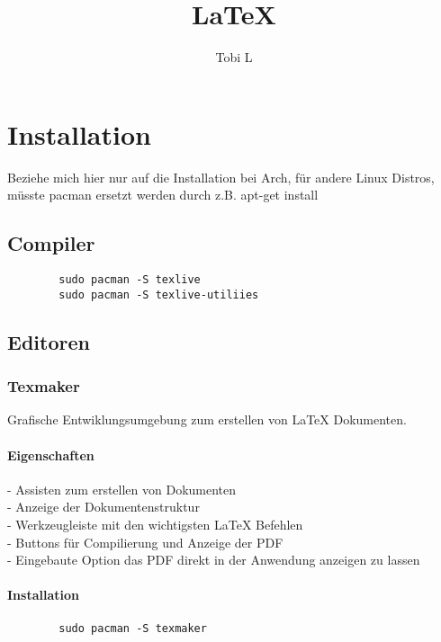 \documentclass[10pt,a4paper,oneside]{report}
\author{Tobi L}
\title{LaTeX}
\begin{document}
\maketitle
\tableofcontents
\chapter{Installation}
Beziehe mich hier nur auf die Installation bei Arch, für andere Linux Distros, müsste pacman ersetzt werden durch z.B. apt-get install\\
\section{Compiler}
	\begin{verbatim}
		sudo pacman -S texlive
		sudo pacman -S texlive-utiliies
	\end{verbatim}
\section{Editoren}
\subsection{Texmaker}
Grafische Entwiklungsumgebung zum erstellen von LaTeX Dokumenten.\\
\subsubsection{Eigenschaften}
	\hspace*{5mm} - Assisten zum erstellen von Dokumenten\\
	\hspace*{5mm} - Anzeige der Dokumentenstruktur\\
	\hspace*{5mm} - Werkzeugleiste mit den wichtigsten LaTeX Befehlen\\
	\hspace*{5mm} - Buttons für Compilierung und Anzeige der PDF\\
	\hspace*{5mm} - Eingebaute Option das PDF direkt in der Anwendung anzeigen zu lassen\\
\subsubsection{Installation}
	\begin{verbatim}
		sudo pacman -S texmaker
	\end{verbatim}
\end{document}

